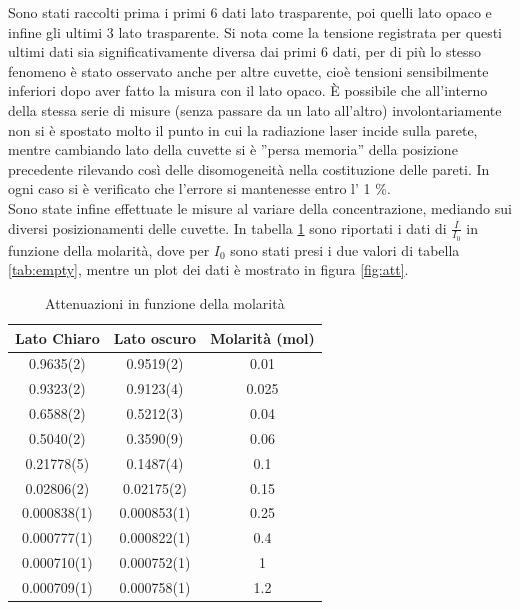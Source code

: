 \documentclass[a4paper]{article}
\begin{document}
Sono stati raccolti prima i primi 6 dati lato trasparente, poi quelli lato opaco e infine gli ultimi 3 lato trasparente. Si nota come la tensione registrata per questi ultimi dati sia significativamente diversa dai primi 6 dati, per di più lo stesso fenomeno è stato osservato anche per altre cuvette, cioè tensioni sensibilmente inferiori dopo aver fatto la misura con il lato opaco. È possibile che all'interno della stessa serie di misure (senza passare da un lato all'altro) involontariamente non si è spostato molto il punto in cui la radiazione laser incide sulla parete, mentre cambiando lato della cuvette si è ''persa memoria'' della posizione precedente rilevando così delle disomogeneità nella costituzione delle pareti. In ogni caso si è verificato che l'errore si mantenesse entro l' 1 $\%$.\\
Sono state infine effettuate le misure al variare della concentrazione, mediando sui diversi posizionamenti delle cuvette. In tabella \ref{tab:att} sono riportati i dati di $\frac{I}{I_0}$ in funzione della molarità, dove per $I_0$ sono stati presi i due valori di tabella \ref{tab:empty}, mentre un plot dei dati è mostrato in figura \ref{fig:att}.

\begin{table}[htp]
\centering
\caption{Attenuazioni in funzione della molarità}
\label{tab:att}
\begin{tabular}{c|c|c}
\textbf{Lato Chiaro} & \textbf{Lato oscuro} & \textbf{Molarità (mol)}\\ 	
\hline 
0.9635(2) & 0.9519(2) & 0.01 \\ 
\hline 
0.9323(2) & 0.9123(4) & 0.025 \\ 
\hline 
0.6588(2) & 0.5212(3) & 0.04 \\ 
\hline 
0.5040(2) & 0.3590(9) & 0.06 \\ 
\hline 
0.21778(5) & 0.1487(4) & 0.1 \\ 
\hline 
0.02806(2) & 0.02175(2) & 0.15 \\ 
\hline 
0.000838(1) & 0.000853(1) & 0.25 \\ 
\hline 
0.000777(1) & 0.000822(1) & 0.4 \\ 
\hline 
0.000710(1) & 0.000752(1) & 1 \\ 
\hline 
0.000709(1) & 0.000758(1) & 1.2 \\ 
\end{tabular} 
\end{table}
\end{document}
